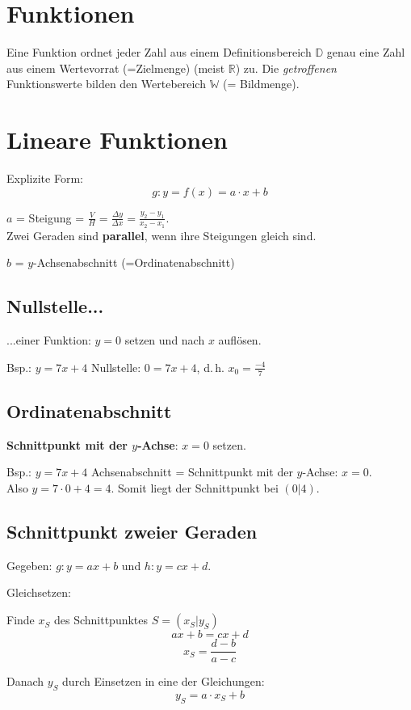 \begin{multicols}{2}
\hrulefill
\section*{Funktionen}

Eine Funktion ordnet jeder Zahl aus einem Definitionsbereich
$\mathbb{D}$ genau eine Zahl aus einem Wertevorrat (=Zielmenge) (meist
$\mathbb{R}$)
zu. Die \textit{getroffenen} Funktionswerte bilden den Wertebereich
$\mathbb{W}$ (= Bildmenge).

\hrulefill
\section*{Lineare Funktionen}
Explizite Form:
$$g: y = f(x) = a\cdot{}x + b$$

$a$ = Steigung = $\frac{V}{H}=\frac{\Delta y}{\Delta x} = \frac{y_2-y_1}{x_2-x_1}$.\\
Zwei Geraden sind \textbf{parallel}, wenn ihre Steigungen gleich sind.

$b$ = $y$-Achsenabschnitt (=Ordinatenabschnitt)


\subsection*{Nullstelle...} ...einer Funktion: $y=0$ setzen und nach $x$
auf\/lösen.

Bsp.: $y=7x+4$ Nullstelle: $0 = 7x+4$, d.\,h. $x_0=\frac{-4}{7}$

\subsection*{Ordinatenabschnitt}
\textbf{Schnittpunkt mit der $y$-Achse}: $x=0$ setzen.

Bsp.: $y=7x+4$ Achsenabschnitt = Schnittpunkt mit der $y$-Achse:
$x=0$.\\
Also $y=7\cdot{}0 + 4 = 4$. Somit liegt der Schnittpunkt bei $(0|4)$.


\subsection*{Schnittpunkt zweier Geraden}
Gegeben: $g: y=ax+b$ und $h: y=cx+d$.

Gleichsetzen:

Finde $x_S$ des Schnittpunktes $S=(x_S|y_S)$
$$ax+b = cx+d$$
$$x_S = \frac{d-b}{a-c}$$

Danach $y_S$ durch Einsetzen in eine der Gleichungen:
$$y_S = a\cdot{}x_S + b$$


\end{multicols}
